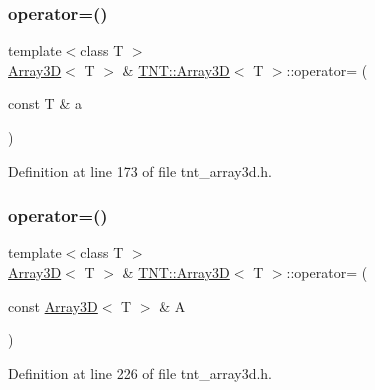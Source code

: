 \subsubsection{\texorpdfstring{operator=()}{operator=()}\hspace{0.1cm}{\footnotesize\ttfamily [1/2]}}
{\footnotesize\ttfamily template$<$class T $>$ \\
\hyperlink{classTNT_1_1Array3D}{Array3D}$<$ T $>$ \& \hyperlink{classTNT_1_1Array3D}{T\+N\+T\+::\+Array3D}$<$ T $>$\+::operator= (\begin{DoxyParamCaption}\item[{const T \&}]{a }\end{DoxyParamCaption})\hspace{0.3cm}{\ttfamily [inline]}}



Definition at line 173 of file tnt\+\_\+array3d.\+h.

\mbox{\label{classTNT_1_1Array3D_a13fa6cf87fcfc5847972569f325f9b56}} 
\subsubsection{\texorpdfstring{operator=()}{operator=()}\hspace{0.1cm}{\footnotesize\ttfamily [2/2]}}
{\footnotesize\ttfamily template$<$class T $>$ \\
\hyperlink{classTNT_1_1Array3D}{Array3D}$<$ T $>$ \& \hyperlink{classTNT_1_1Array3D}{T\+N\+T\+::\+Array3D}$<$ T $>$\+::operator= (\begin{DoxyParamCaption}\item[{const \hyperlink{classTNT_1_1Array3D}{Array3D}$<$ T $>$ \&}]{A }\end{DoxyParamCaption})\hspace{0.3cm}{\ttfamily [inline]}}



Definition at line 226 of file tnt\+\_\+array3d.\+h.

\mbox{\label{classTNT_1_1Array3D_aea9175ed3125b3061f3be0db72656518}} 
